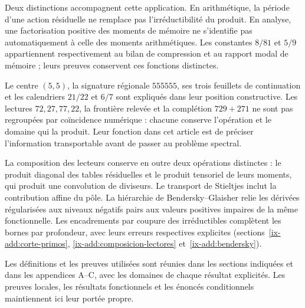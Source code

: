 Deux distinctions accompagnent cette application. En arithmétique, la période d’une action
résiduelle ne remplace pas l’irréductibilité du produit. En analyse, une
factorisation positive des moments de mémoire ne s’identifie pas
automatiquement à celle des moments arithmétiques. Les constantes
\(8/81\) et \(5/9\) appartiennent respectivement au bilan de compression et
au rapport modal de mémoire ; leurs preuves conservent ces fonctions distinctes.

Le centre \((5,5)\), la signature régionale \(555555\), ses trois feuillets de
continuation et les calendriers \(21/22\) et \(6/7\) sont expliqués dans leur position
constructive. Les lectures \(72,27,77,22\), la frontière relevée et la
complétion \(729+271\) ne sont pas regroupées par coïncidence numérique : chacune
conserve l’opération et le domaine qui la produit. Leur fonction dans cet
article est de préciser l’information transportable avant de passer au
problème spectral.

La composition des lecteurs conserve en outre deux opérations distinctes : le produit diagonal des tables résiduelles et le produit tensoriel de leurs moments, qui produit une convolution de diviseurs. Le transport de Stieltjes inclut la contribution affine du pôle. La hiérarchie de Bendersky--Glaisher relie les dérivées régularisées aux niveaux négatifs pairs aux valeurs positives impaires de la même fonctionnelle. Les encadrements par coupure des irréductibles complètent les bornes par profondeur, avec leurs erreurs respectives explicites (sections~\ref{ix-add:corte-primos}, \ref{ix-add:composicion-lectores} et~\ref{ix-add:bendersky}).

Les définitions et les preuves utilisées sont réunies dans les sections indiquées
et dans les appendices A--C, avec les domaines de chaque résultat explicités.
Les preuves locales, les résultats fonctionnels et les énoncés
conditionnels maintiennent ici leur portée propre.
